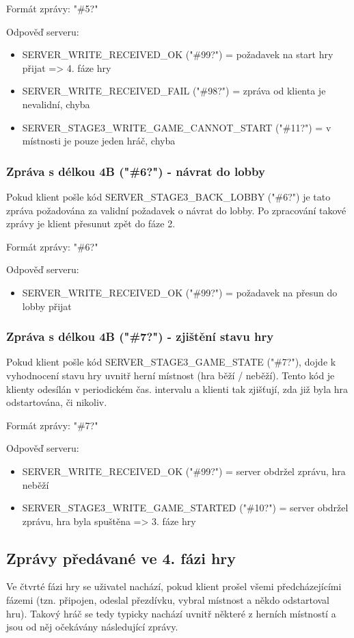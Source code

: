 \documentclass[12pt, a4paper, pdftex, czech, titlepage]{report}
\begin{document}
Formát zprávy: "\#5?"

Odpověď serveru:
\begin{itemize}
\item SERVER\_WRITE\_RECEIVED\_OK ("\#99?") = požadavek na start hry přijat => 4. fáze hry
\item SERVER\_WRITE\_RECEIVED\_FAIL ("\#98?") = zpráva od klienta je nevalidní, chyba
\item SERVER\_STAGE3\_WRITE\_GAME\_CANNOT\_START ("\#11?") = v místnosti je pouze jeden hráč, chyba
\end{itemize}


\subsubsection{Zpráva s délkou 4B ("\#6?") - návrat do lobby}
Pokud klient pošle kód SERVER\_STAGE3\_BACK\_LOBBY ("\#6?") je tato zpráva
požadována za validní požadavek o návrat do lobby. Po zpracování
takové zprávy je klient přesunut zpět do fáze 2.

Formát zprávy: "\#6?"

Odpověď serveru:
\begin{itemize}
\item SERVER\_WRITE\_RECEIVED\_OK ("\#99?") = požadavek na přesun do lobby přijat
\end{itemize}

\subsubsection{Zpráva s délkou 4B ("\#7?") - zjištění stavu hry}
Pokud klient pošle kód SERVER\_STAGE3\_GAME\_STATE ("\#7?"),
dojde k vyhodnocení stavu hry uvnitř herní místnost (hra běží / neběží).
Tento kód je klienty odesílán v periodickém čas. intervalu a klienti tak zjišťují,
zda již byla hra odstartována, či nikoliv.

Formát zprávy: "\#7?"

Odpověď serveru:
\begin{itemize}
\item SERVER\_WRITE\_RECEIVED\_OK ("\#99?") = server obdržel zprávu, hra neběží
\item SERVER\_STAGE3\_WRITE\_GAME\_STARTED ("\#10?") = server obdržel zprávu, hra byla spuštěna => 3. fáze hry
\end{itemize}

\subsection{Zprávy předávané ve 4. fázi hry}
Ve čtvrté fázi hry se uživatel nachází, pokud klient prošel všemi předcházejícími fázemi (tzn. připojen,
odeslal přezdívku, vybral místnost a někdo odstartoval hru). Takový hráč se tedy typicky nachází uvnitř některé z herních místností
a jsou od něj očekávány následující zprávy.
\end{document}
